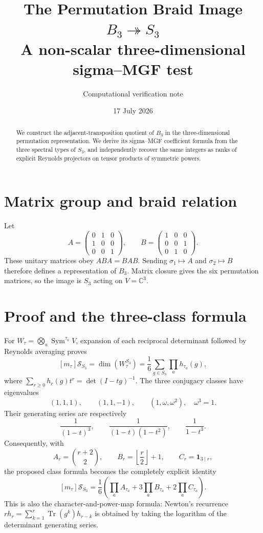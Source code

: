 \documentclass[11pt]{article}
\title{\color{navy}\bfseries The Permutation Braid Image $B_3\twoheadrightarrow S_3$\\
\large A non-scalar three-dimensional sigma--MGF test}
\author{Computational verification note}\date{17 July 2026}
\newcommand{\Sgm}{\mathcal S}
\begin{document}
\maketitle

\begin{abstract}
We construct the adjacent-transposition quotient of $B_3$ in the
three-dimensional permutation representation.  We derive its sigma--MGF
coefficient formula from the three spectral types of $S_3$, and independently
recover the same integers as ranks of explicit Reynolds projectors on tensor
products of symmetric powers.
\end{abstract}

\section{Matrix group and braid relation}
Let
\[
 A=\begin{pmatrix}0&1&0\\1&0&0\\0&0&1\end{pmatrix},\qquad
 B=\begin{pmatrix}1&0&0\\0&0&1\\0&1&0\end{pmatrix}.
\]
These unitary matrices obey $ABA=BAB$.  Sending
$\sigma_1\mapsto A$ and $\sigma_2\mapsto B$ therefore defines a
representation of $B_3$.  Matrix closure gives the six permutation matrices,
so the image is $S_3$ acting on $V=\mathbb C^3$.

\section{Proof and the three-class formula}
For $W_\tau=\bigotimes_a\operatorname{Sym}^{\tau_a}V$, expansion of each
reciprocal determinant followed by Reynolds averaging proves
\[
 [m_\tau]\Sgm_{S_3}=\dim(W_\tau^{S_3})
 =\frac16\sum_{g\in S_3}\prod_a h_{\tau_a}(g),
\]
where $\sum_{r\geq0}h_r(g)t^r=\det(I-tg)^{-1}$.  The three conjugacy
classes have eigenvalues
\[
 (1,1,1),\qquad(1,1,-1),\qquad(1,\omega,\omega^2),
 \quad \omega^3=1.
\]
Their generating series are respectively
\[
 \frac1{(1-t)^3},\qquad \frac1{(1-t)(1-t^2)},\qquad\frac1{1-t^3}.
\]
Consequently, with
\[
 A_r=\binom{r+2}{2},\qquad B_r=\left\lfloor\frac r2\right\rfloor+1,
 \qquad C_r=\mathbf1_{3\mid r},
\]
the proposed class formula becomes the completely explicit identity
\[
 \boxed{[m_\tau]\Sgm_{S_3}=\frac16\left(
 \prod_a A_{\tau_a}+3\prod_a B_{\tau_a}+2\prod_a C_{\tau_a}\right).}
\]
This is also the character-and-power-map formula: Newton's recurrence
$r h_r=\sum_{k=1}^r\operatorname{Tr}(g^k)h_{r-k}$ is obtained by taking
the logarithm of the determinant generating series.
\end{document}
